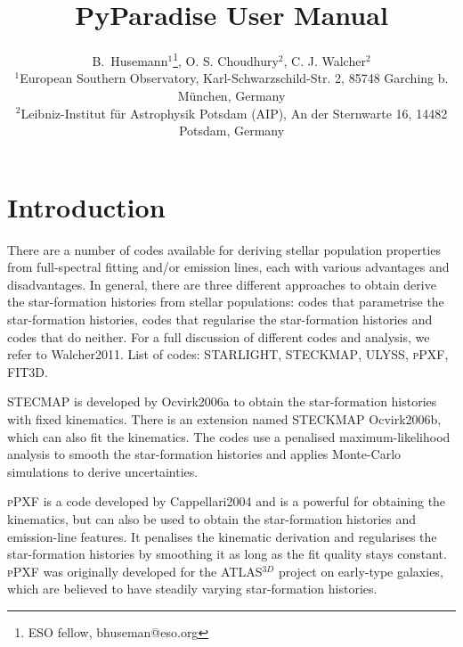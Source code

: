 \documentclass[usenatbib,usegraphicx,useAMS,onecolumn]{mn2e}
\begin{document}
\title{PyParadise User Manual}

\author[Husemann et al.]{B.~Husemann$^{1}$\thanks{ESO fellow, bhuseman@eso.org}, O. S. Choudhury$^{2}$, C. J. Walcher$^{2}$\newauthor\\
$^1$European Southern Observatory, Karl-Schwarzschild-Str. 2, 85748 Garching b. M\"unchen, Germany\\
$^2$Leibniz-Institut f\"ur Astrophysik Potsdam (AIP), An der Sternwarte 16, 14482 Potsdam, Germany\\
}
\maketitle
\begin{abstract}

\end{abstract}

\section{Introduction}
\label{sec:introduction}
There are a number of codes available for deriving stellar population properties from full-spectral fitting and/or emission lines, each with various advantages and disadvantages.
In general, there are three different approaches to obtain derive the star-formation histories from stellar populations: codes that parametrise the star-formation histories, codes that regularise the star-formation histories and codes that do neither.
For a full discussion of different codes and analysis, we refer to {Walcher2011}.
List of codes: \textsc{STARLIGHT}, \textsc{STECKMAP}, \textsc{ULYSS}, \textsc{pPXF}, \textsc{FIT3D}.

\textsc{STECMAP} is developed by {Ocvirk2006a} to obtain the star-formation histories with fixed kinematics.
There is an extension named \textsc{STECKMAP} {Ocvirk2006b}, which can also fit the kinematics.
The codes use a penalised maximum-likelihood analysis to smooth the star-formation histories and applies Monte-Carlo simulations to derive uncertainties.

\textsc{pPXF} is a code developed by {Cappellari2004} and is a powerful for obtaining the kinematics, but can also be used to obtain the star-formation histories and emission-line features.
It penalises the kinematic derivation and regularises the star-formation histories by smoothing it as long as the fit quality stays constant. 
\textsc{pPXF} was originally developed for the ATLAS$^{3D}$ project on early-type galaxies, which are believed to have steadily varying star-formation histories.
\end{document}
